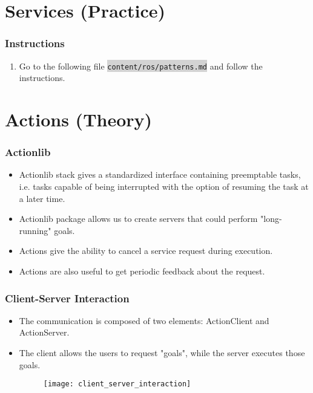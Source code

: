 \documentclass{beamer}
\begin{document}
	\section{Services (Practice)}
	\begin{frame}
		\frametitle{Instructions}
		\begin{enumerate}
			\item{Go to the following file \colorbox{lightgray}{\texttt{content/ros/patterns.md}} and follow the instructions.}
		\end{enumerate}
	\end{frame}
	\section{Actions (Theory)}
	\begin{frame}
		\frametitle{Actionlib}
		\begin{itemize}
			\item{Actionlib stack gives a standardized interface containing preemptable tasks, i.e. tasks capable of being interrupted with the option of resuming the task at a later time.}
			\item{Actionlib package allows us to create servers that could perform "long-running" goals.}
			\item{Actions give the ability to cancel a service request during execution.}
			\item{Actions are also useful to get periodic feedback about the request.}
		\end{itemize}
	\end{frame}
	
	\begin{frame}
		\frametitle{Client-Server Interaction}
		\begin{itemize}
			\item{The communication is composed of two elements: ActionClient and ActionServer.}
			\item{The client allows the users to request "goals", while the server executes those goals.}
			\begin{figure}[h!]
				\texttt{[image: client\_server\_interaction]}
			\end{figure}
			
		\end{itemize}
	\end{frame}
	
\end{document}
